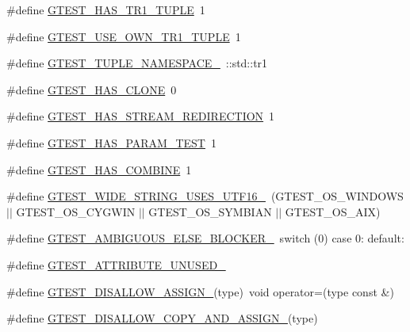 \begin{DoxyCompactItemize}
\#define \hyperlink{gtest-port_8h_a6de49dd4cbae1db15dc6edca3b179d1b}{G\+T\+E\+S\+T\+\_\+\+H\+A\+S\+\_\+\+T\+R1\+\_\+\+T\+U\+P\+LE}~1
\item 
\#define \hyperlink{gtest-port_8h_afa144e5f5d039db0df873e7ad48c1fda}{G\+T\+E\+S\+T\+\_\+\+U\+S\+E\+\_\+\+O\+W\+N\+\_\+\+T\+R1\+\_\+\+T\+U\+P\+LE}~1
\item 
\#define \hyperlink{gtest-port_8h_a2023f59bfbd8fb7148262a63bdbf0b01}{G\+T\+E\+S\+T\+\_\+\+T\+U\+P\+L\+E\+\_\+\+N\+A\+M\+E\+S\+P\+A\+C\+E\+\_\+}~\+::std\+::tr1
\item 
\#define \hyperlink{gtest-port_8h_a40c075a7f969a694e59532356be59fd5}{G\+T\+E\+S\+T\+\_\+\+H\+A\+S\+\_\+\+C\+L\+O\+NE}~0
\item 
\#define \hyperlink{gtest-port_8h_add695166eb7b691f93777525d5881062}{G\+T\+E\+S\+T\+\_\+\+H\+A\+S\+\_\+\+S\+T\+R\+E\+A\+M\+\_\+\+R\+E\+D\+I\+R\+E\+C\+T\+I\+ON}~1
\item 
\#define \hyperlink{gtest-port_8h_a743ee591e0b9a044e3d7513ad5ab5ef9}{G\+T\+E\+S\+T\+\_\+\+H\+A\+S\+\_\+\+P\+A\+R\+A\+M\+\_\+\+T\+E\+ST}~1
\item 
\#define \hyperlink{gtest-port_8h_a91a068d3bf6855b6f399f01836ae1482}{G\+T\+E\+S\+T\+\_\+\+H\+A\+S\+\_\+\+C\+O\+M\+B\+I\+NE}~1
\item 
\#define \hyperlink{gtest-port_8h_a0e3904ca8d62334ab5f29c057dceb6a1}{G\+T\+E\+S\+T\+\_\+\+W\+I\+D\+E\+\_\+\+S\+T\+R\+I\+N\+G\+\_\+\+U\+S\+E\+S\+\_\+\+U\+T\+F16\+\_\+}~(G\+T\+E\+S\+T\+\_\+\+O\+S\+\_\+\+W\+I\+N\+D\+O\+WS $\vert$$\vert$ G\+T\+E\+S\+T\+\_\+\+O\+S\+\_\+\+C\+Y\+G\+W\+IN $\vert$$\vert$ G\+T\+E\+S\+T\+\_\+\+O\+S\+\_\+\+S\+Y\+M\+B\+I\+AN $\vert$$\vert$ G\+T\+E\+S\+T\+\_\+\+O\+S\+\_\+\+A\+IX)
\item 
\#define \hyperlink{gtest-port_8h_a00b3684a621ce1422b55a0e7e8a6aecb}{G\+T\+E\+S\+T\+\_\+\+A\+M\+B\+I\+G\+U\+O\+U\+S\+\_\+\+E\+L\+S\+E\+\_\+\+B\+L\+O\+C\+K\+E\+R\+\_\+}~switch (0) case 0\+: default\+:
\item 
\#define \hyperlink{gtest-port_8h_acdd47601a9376161c349a5881ccc6918}{G\+T\+E\+S\+T\+\_\+\+A\+T\+T\+R\+I\+B\+U\+T\+E\+\_\+\+U\+N\+U\+S\+E\+D\+\_\+}
\item 
\#define \hyperlink{gtest-port_8h_ac593b50ce24257d5b6aa84845c344c9e}{G\+T\+E\+S\+T\+\_\+\+D\+I\+S\+A\+L\+L\+O\+W\+\_\+\+A\+S\+S\+I\+G\+N\+\_\+}(type)~void operator=(type const \&)
\item 
\#define \hyperlink{gtest-port_8h_aed8c1888c32b588b0681e88b95031e29}{G\+T\+E\+S\+T\+\_\+\+D\+I\+S\+A\+L\+L\+O\+W\+\_\+\+C\+O\+P\+Y\+\_\+\+A\+N\+D\+\_\+\+A\+S\+S\+I\+G\+N\+\_\+}(type)
$$
\end{DoxyCompactItemize}
